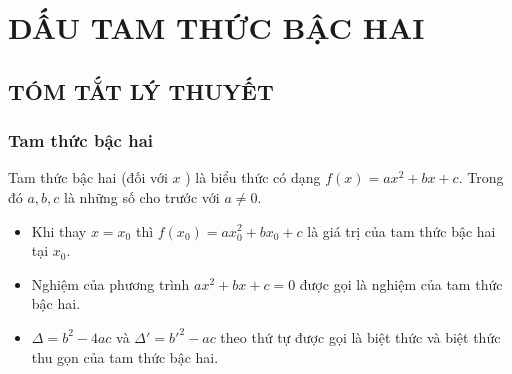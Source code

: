 \section{DẤU TAM THỨC BẬC HAI}
\subsection{TÓM TẮT LÝ THUYẾT}
\subsubsection{Tam thức bậc hai}
Tam thức bậc hai (đối với $x$ ) là biểu thức có dạng $f(x)=ax^2+bx+c$. Trong đó $a, b, c$ là những số cho trước với $a\ne 0$.
\begin{boxkn}
	\begin{itemize}
		\item Khi thay $x=x_0$ thì $f(x_0)=ax_0^2+bx_0+c$ là giá trị của tam thức bậc hai tại $x_0$.
		\item Nghiệm của phương trình $ax^2+bx+c=0$ được gọi là nghiệm của tam thức bậc hai.
		\item $ \Delta =b^2-4ac$ và $ \Delta '=b'^2-ac$ theo thứ tự được gọi là biệt thức và biệt thức thu gọn của tam thức bậc hai.
	\end{itemize}
\end{boxkn}
